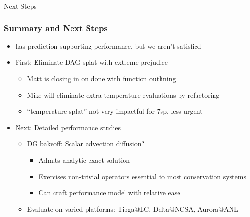 \begin{frame}
    \centering
    \Large
    Next Steps
\end{frame}

\begin{frame}\frametitle{Summary and Next Steps}
\begin{itemize}
\item \mirgecom{} has prediction-supporting performance, but we aren't satisfied
\item First: Eliminate DAG splat with extreme prejudice
\begin{itemize}
\item Matt is closing in on done with function outlining
\item Mike will eliminate extra temperature evaluations by refactoring
\item ``temperature splat'' not very impactful for 7sp, less urgent
\end{itemize}
\item Next: Detailed performance studies
\begin{itemize}
\item DG bakeoff: Scalar advection diffusion?
\begin{itemize}
\item Admits analytic exact solution
\item Exercises non-trivial operators essential to most conservation systems
\item Can craft performance model with relative ease
\end{itemize}
\item Evaluate on varied platforms: Tioga@LC, Delta@NCSA, Aurora@ANL
\end{itemize}
\end{itemize}
\end{frame}

%

